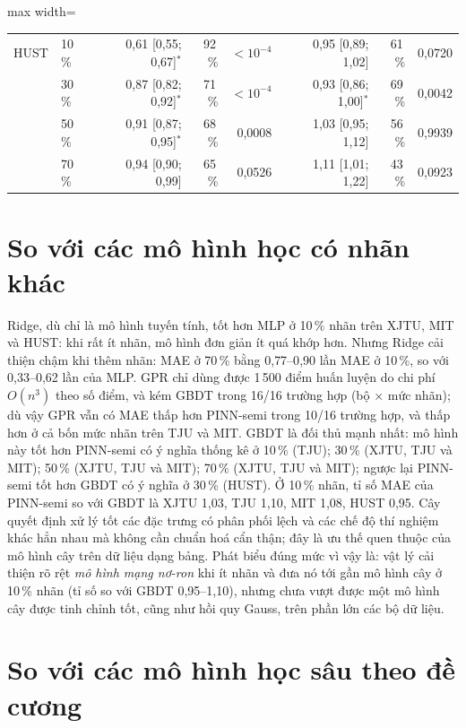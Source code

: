 \documentclass[12pt,a4paper,oneside]{report}
\theoremstyle{plain}
\theoremstyle{definition}
\begin{document}
\begin{table}[!htbp]
\begin{adjustbox}{max width=\textwidth}
\begin{tabular}{llrrrrrr}
HUST & 10\,\% & 0{,}61 [0{,}55; 0{,}67]$^{*}$ & 92\,\% & $<10^{-4}$ & 0{,}95 [0{,}89; 1{,}02] & 61\,\% & 0{,}0720 \\
 & 30\,\% & 0{,}87 [0{,}82; 0{,}92]$^{*}$ & 71\,\% & $<10^{-4}$ & 0{,}93 [0{,}86; 1{,}00]$^{*}$ & 69\,\% & 0{,}0042 \\
 & 50\,\% & 0{,}91 [0{,}87; 0{,}95]$^{*}$ & 68\,\% & 0{,}0008 & 1{,}03 [0{,}95; 1{,}12] & 56\,\% & 0{,}9939 \\
 & 70\,\% & 0{,}94 [0{,}90; 0{,}99] & 65\,\% & 0{,}0526 & 1{,}11 [1{,}01; 1{,}22] & 43\,\% & 0{,}0923 \\
\bottomrule\end{tabular}\end{adjustbox}\end{table}


\section{So với các mô hình học có nhãn khác}

Ridge, dù chỉ là mô hình tuyến tính, tốt hơn MLP ở 10\,\% nhãn trên XJTU, MIT và HUST: khi rất ít nhãn, mô hình đơn giản ít quá khớp hơn. Nhưng Ridge cải thiện chậm khi thêm nhãn: MAE ở 70\,\% bằng 0{,}77--0{,}90 lần MAE ở 10\,\%, so với 0{,}33--0{,}62 lần của MLP. GPR chỉ dùng được 1\,500 điểm huấn luyện do chi phí $O(n^3)$ theo số điểm, và kém GBDT trong 16/16 trường hợp (bộ × mức nhãn); dù vậy GPR vẫn có MAE thấp hơn PINN-semi trong 10/16 trường hợp, và thấp hơn ở cả bốn mức nhãn trên TJU và MIT. GBDT là đối thủ mạnh nhất: mô hình này tốt hơn PINN-semi có ý nghĩa thống kê ở 10\,\% (TJU); 30\,\% (XJTU, TJU và MIT); 50\,\% (XJTU, TJU và MIT); 70\,\% (XJTU, TJU và MIT); ngược lại PINN-semi tốt hơn GBDT có ý nghĩa ở 30\,\% (HUST). Ở 10\,\% nhãn, tỉ số MAE của PINN-semi so với GBDT là XJTU 1{,}03, TJU 1{,}10, MIT 1{,}08, HUST 0{,}95. Cây quyết định xử lý tốt các đặc trưng có phân phối lệch và
các chế độ thí nghiệm khác hẳn nhau mà không cần chuẩn hoá cẩn thận; đây là ưu thế quen thuộc của mô hình cây trên
dữ liệu dạng bảng. Phát biểu đúng mức vì vậy là: vật lý cải thiện rõ rệt \emph{mô hình mạng nơ-ron} khi ít nhãn và
đưa nó tới gần mô hình cây ở 10\,\% nhãn (tỉ số so với GBDT 0{,}95--1{,}10), nhưng chưa vượt được một mô hình cây
được tinh chỉnh tốt, cũng như hồi quy Gauss, trên phần lớn các bộ dữ liệu.


\section{So với các mô hình học sâu theo đề cương}\label{sec:dlres}
\end{document}
